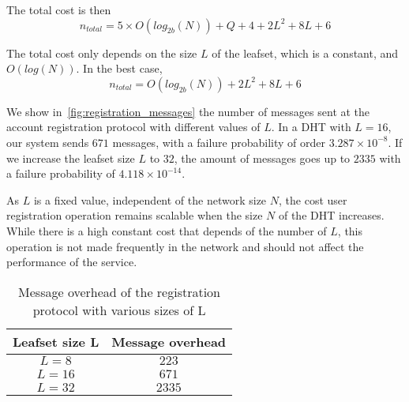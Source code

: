      The total cost is then
    $$
      n_{total} = 5 \times O(log_{2b}(N)) + Q + 4 + 2L^2 + 8L + 6
    $$    

    The total cost only depends on the size $L$ of the leafset, which is a
constant, and $O(log(N))$. In the best case, 
    $$
      n_{total} = O(log_{2b}(N)) + 2L^2 + 8L + 6
    $$

    We show in~\ref{fig:registration_messages} the number of messages sent at
    the account registration protocol with different values of $L$. In a DHT with
    $L = 16$, our system sends $671$ messages, with a failure probability of
    order $3.287 \times 10^{-8}$. If we increase the leafset size $L$ to $32$, the amount of
    messages goes up to $2335$ with a failure probability of $4.118 \times 10^{-14}$.
  
    As $L$ is a fixed value, independent of the network size $N$, the cost user
    registration operation remains scalable when the
    size $N$ of the DHT increases. While there is a high constant cost that
    depends of the number of $L$, this operation is not made frequently
    in the network and should not affect the performance of the
    service.


\begin{table}
  \centering
  \footnotesize
  \begin{tabular}{|c|c|}
    \hline
     \textbf{Leafset size L} & \textbf{Message overhead}\\
    \hline
      $L = 8$ & $223$\\
    \hline
      $L = 16$ & $671$\\
    \hline
      $L = 32$ & $2335$\\
    \hline
  \end{tabular}
  \caption{Message overhead of the registration protocol with various sizes of L}
  \label{tab:registration_messages}
\end{table}


